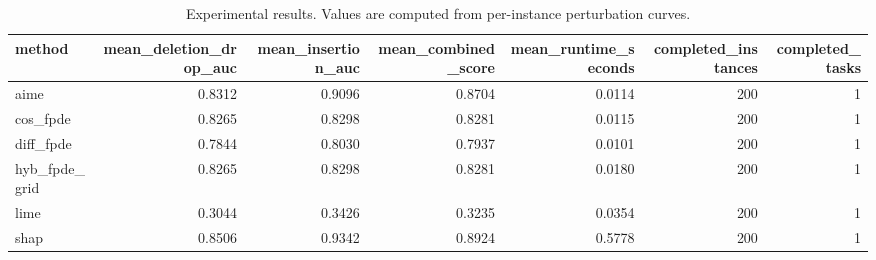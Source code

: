\begin{table}[t]
\caption{Experimental results. Values are computed from per-instance perturbation curves.}
\label{tab:main_results_computed}
\centering
\begin{tabular}{lrrrrrr}
\toprule
method & mean\_deletion\_drop\_auc & mean\_insertion\_auc & mean\_combined\_score & mean\_runtime\_seconds & completed\_instances & completed\_tasks \\
\midrule
aime & 0.8312 & 0.9096 & 0.8704 & 0.0114 & 200 & 1 \\
cos\_fpde & 0.8265 & 0.8298 & 0.8281 & 0.0115 & 200 & 1 \\
diff\_fpde & 0.7844 & 0.8030 & 0.7937 & 0.0101 & 200 & 1 \\
hyb\_fpde\_grid & 0.8265 & 0.8298 & 0.8281 & 0.0180 & 200 & 1 \\
lime & 0.3044 & 0.3426 & 0.3235 & 0.0354 & 200 & 1 \\
shap & 0.8506 & 0.9342 & 0.8924 & 0.5778 & 200 & 1 \\
\bottomrule
\end{tabular}

\end{table}
